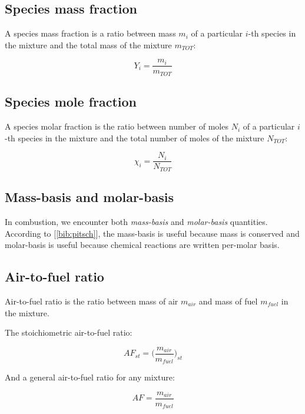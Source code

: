 \documentclass[10pt,twocolumn]{article}
\begin{document}
\subsection{Species mass fraction}

A species mass fraction is a ratio between mass $m_i$ of a particular $i$-th species in the mixture and the total mass of the mixture $m_{TOT}$:

\begin{equation}
Y_i = \frac{m_i}{m_{TOT}}
\end{equation}

\subsection{Species mole fraction}

A species molar fraction is the ratio between number of moles $N_i$ of a particular $i$-th species in the mixture and the total number of moles of the mixture $N_{TOT}$:

\begin{equation}
\chi_i = \frac{N_i}{N_{TOT}}
\end{equation}

\subsection{Mass-basis and molar-basis}

In combustion, we encounter both \textit{mass-basis} and \textit{molar-basis} quantities. According to [\ref{bib:pitsch}], the mass-basis is useful because mass is conserved and molar-basis is useful because chemical reactions are written per-molar basis.

\subsection{Air-to-fuel ratio}

Air-to-fuel ratio is the ratio between mass of air $m_{air}$ and mass of fuel $m_{fuel}$ in the mixture.

The stoichiometric air-to-fuel ratio:

\begin{equation}
AF_{st} = \Big( \frac{m_{air}}{m_{fuel}} \Big)_{st}
\end{equation}

And a general air-to-fuel ratio for any mixture:

\begin{equation}
AF = \frac{m_{air}}{m_{fuel}}
\end{equation}
\end{document}
